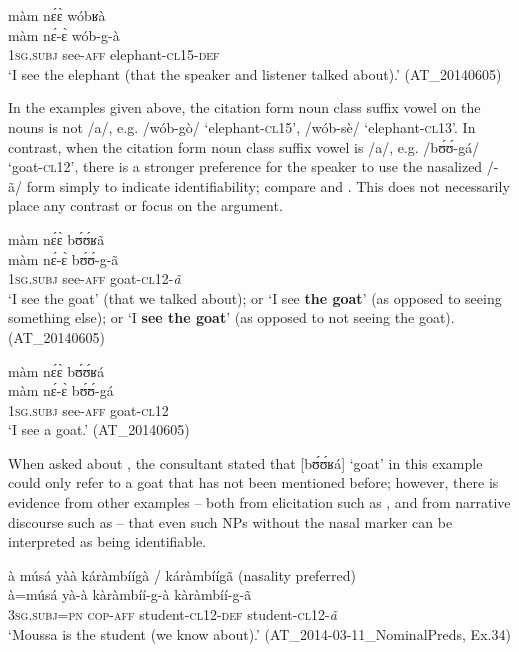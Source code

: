 \documentclass[output=paper]{langsci/langscibook}
\begin{document}
\ea\label{ex:teo:47}
\glll màm  n\'ɛ\`ɛ wóbʁà\\
 màm n\'ɛ-\`ɛ wób-g-à\\
1\textsc{sg.subj} see-\textsc{aff} elephant-\textsc{cl15-def}\\
\glt ‘I see the elephant (that the speaker and listener talked about).’ (AT\_20140605)
\z

In the examples given above, the citation form noun class suffix vowel on the nouns is not /a/, e.g. /wób-gò/ ‘elephant-\textsc{cl15}’, /wób-sè/ ‘elephant-\textsc{cl13}’. In contrast, when the citation form noun class suffix vowel is /a/, e.g. /b\'ʊ\'ʊ-gá/ ‘goat-\textsc{cl12}’, there is a stronger preference for the speaker to use the nasalized /-ã/ form simply to indicate identifiability; compare  and . This does not necessarily place any contrast or focus on the argument.


\ea\label{ex:teo:48}
\glll màm  n\'ɛ\`ɛ b\'ʊ\'ʊʁã\\
màm n\'ɛ-\`ɛ b\'ʊ\'ʊ-g-ã\\
\textsc{1sg.subj} see-\textsc{aff} goat-\textsc{cl12}-\textit{ã}\\
\glt ‘I see the goat’ (that we talked about); or ‘I see \textbf{the goat}’ (as opposed to seeing something else); or ‘I \textbf{see the goat}’ (as opposed to not seeing the goat). (AT\_20140605)
\z

\ea\label{ex:teo:49}
\glll màm n\'ɛ\`ɛ b\'ʊ\'ʊʁá\\
màm n\'ɛ-\`ɛ b\'ʊ\'ʊ-gá\\
\textsc{1sg.subj} see-\textsc{aff} goat-\textsc{cl12}\\
\glt ‘I see a goat.’ (AT\_20140605)
\z

When asked about , the consultant stated that [b\'ʊ\'ʊʁá] ‘goat’ in this example could only refer to a goat that has not been mentioned before; however, there is evidence from other examples – both from elicitation such as , and from narrative discourse such as  – that even such NPs without the nasal marker can be interpreted as being identifiable.

\ea\label{ex:teo:50}
\glll à músá yàà káràmbíígà / káràmbíígã (nasality preferred)\\
à=músá yà-à kàràmbíí-g-à kàràmbíí-g-ã\\
\textsc{3sg.subj=pn} \textsc{cop-aff} student-\textsc{cl12-def} student-\textsc{cl12}-\textit{ã}\\
\glt ‘Moussa is the student (we know about).’ (AT\_2014-03-11\_NominalPreds, Ex.34)
\z
\end{document}

